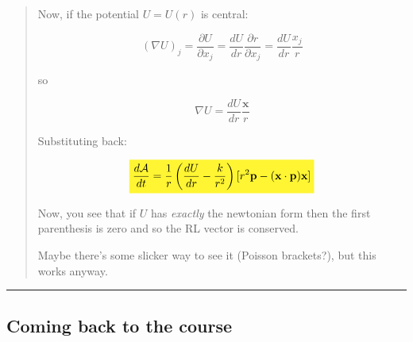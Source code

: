 \begin{quote}
        Now, if the potential $U=U(r)$ is central:

        \begin{equation}
        (\nabla U)_j=\frac{\partial U}{\partial x_j}=\frac{dU}{dr}\frac{\partial r}{\partial x_j}=\frac{dU}{dr}\frac{x_j}{r}
        \end{equation}

        so 

        \begin{equation} \nabla U=\frac{dU}{dr}\frac{\textbf{x}}{r}\end{equation}

        Substituting back:

        \begin{equation}
            \hlMath{\frac{d\mathcal A}{dt}=\frac{1}{r}\left(\frac{dU}{dr}-\frac{k}{r^2}\right)[r^2\textbf{p}-(\textbf{x}\cdot\textbf{p})\textbf{x}]}
        \end{equation}

        Now, you see that if $U$ has \textit{exactly} the newtonian form then the first parenthesis is zero and so the RL vector is conserved. 

        Maybe there's some slicker way to see it (Poisson brackets?), but this works anyway.
    \end{quote}
    \begin{center}\noindent\rule{8cm}{0.4pt}\end{center}
    

    \subsection{Coming back to the course}

